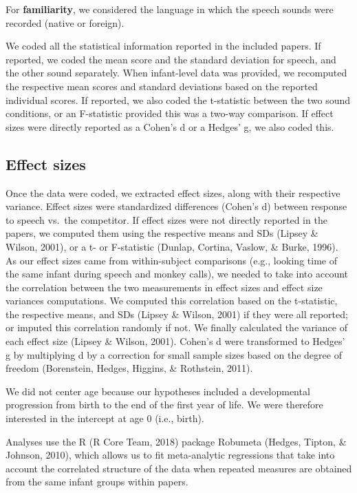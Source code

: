 \documentclass[
  english,
  man]{apa6}
\begin{document}
For \textbf{familiarity}, we considered the language in which the speech sounds were recorded (native or foreign).

We coded all the statistical information reported in the included papers. If reported, we coded the mean score and the standard deviation for speech, and the other sound separately. When infant-level data was provided, we recomputed the respective mean scores and standard deviations based on the reported individual scores. If reported, we also coded the t-statistic between the two sound conditions, or an F-statistic provided this was a two-way comparison. If effect sizes were directly reported as a Cohen's d or a Hedges' g, we also coded this.

\hypertarget{effect-sizes}{%
\subsection{Effect sizes}\label{effect-sizes}}

Once the data were coded, we extracted effect sizes, along with their respective variance. Effect sizes were standardized differences (Cohen's d) between response to speech vs.~the competitor.
If effect sizes were not directly reported in the papers, we computed them using the respective means and SDs (Lipsey \& Wilson, 2001), or a t- or F-statistic (Dunlap, Cortina, Vaslow, \& Burke, 1996). As our effect sizes came from within-subject comparisons (e.g., looking time of the same infant during speech and monkey calls), we needed to take into account the correlation between the two measurements in effect sizes and effect size variances computations. We computed this correlation based on the t-statistic, the respective means, and SDs (Lipsey \& Wilson, 2001) if they were all reported; or imputed this correlation randomly if not. We finally calculated the variance of each effect size (Lipsey \& Wilson, 2001). Cohen's d were transformed to Hedges' g by multiplying d by a correction for small sample sizes based on the degree of freedom (Borenstein, Hedges, Higgins, \& Rothstein, 2011).

We did not center age because our hypotheses included a developmental progression from birth to the end of the first year of life. We were therefore interested in the intercept at age 0 (i.e., birth).

Analyses use the R (R Core Team, 2018) package Robumeta (Hedges, Tipton, \& Johnson, 2010), which allows us to fit meta-analytic regressions that take into account the correlated structure of the data when repeated measures are obtained from the same infant groups within papers.
\end{document}
